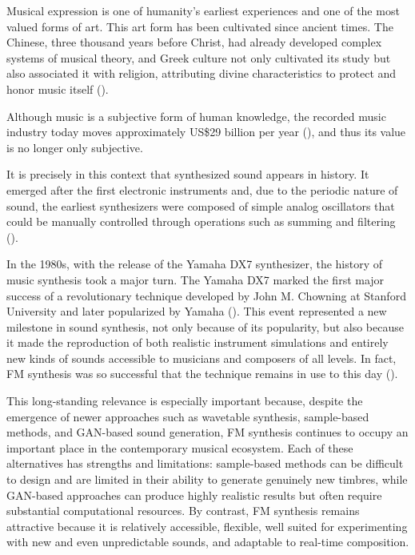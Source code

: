 \newcommand{\comando}[1]{\textbf{$\backslash$#1}}

Musical expression is one of humanity’s earliest experiences and one of the most valued forms of art. This art form has been cultivated since ancient times. The Chinese, three thousand years before Christ, had already developed complex systems of musical theory, and Greek culture not only cultivated its study but also associated it with religion, attributing divine characteristics to protect and honor music itself (\textcite{med1996teoria}).

Although music is a subjective form of human knowledge, the recorded music industry today moves approximately US\$29 billion per year (\textcite{ifpi2025}), and thus its value is no longer only subjective.

It is precisely in this context that synthesized sound appears in history. It emerged after the first electronic instruments and, due to the periodic nature of sound, the earliest synthesizers were composed of simple analog oscillators that could be manually controlled through operations such as summing and filtering (\textcite{holmes2016electronic}).

In the 1980s, with the release of the Yamaha DX7 synthesizer, the history of music synthesis took a major turn. The Yamaha DX7 marked the first major success of a revolutionary technique developed by John M. Chowning at Stanford University and later popularized by Yamaha (\textcite{claesson2021resynthesis}). This event represented a new milestone in sound synthesis, not only because of its popularity, but also because it made the reproduction of both realistic instrument simulations and entirely new kinds of sounds accessible to musicians and composers of all levels. In fact, FM synthesis was so successful that the technique remains in use to this day (\textcite{holmes2016electronic}).

This long-standing relevance is especially important because, despite the emergence of newer approaches such as wavetable synthesis, sample-based methods, and GAN-based sound generation, FM synthesis continues to occupy an important place in the contemporary musical ecosystem. Each of these alternatives has strengths and limitations: sample-based methods can be difficult to design and are limited in their ability to generate genuinely new timbres, while GAN-based approaches can produce highly realistic results but often require substantial computational resources. By contrast, FM synthesis remains attractive because it is relatively accessible, flexible, well suited for experimenting with new and even unpredictable sounds, and adaptable to real-time composition.

